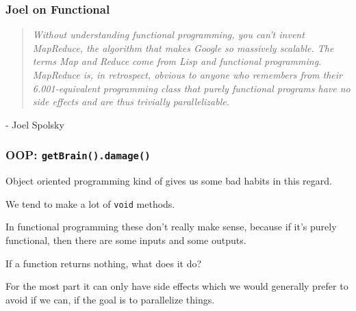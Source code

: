\begin{frame}
\frametitle{Joel on Functional}

\begin{quote}
\textit{Without understanding functional programming, you can't invent MapReduce, the algorithm that makes Google so massively scalable. The terms Map and Reduce come from Lisp and functional programming. MapReduce is, in retrospect, obvious to anyone who remembers from their 6.001-equivalent programming class that purely functional programs have no side effects and are thus trivially parallelizable.}
\end{quote}
\hfill - Joel Spolsky


\end{frame}



\begin{frame}
\frametitle{OOP: \texttt{getBrain().damage()}}

Object oriented programming kind of gives us some bad habits in this regard. 

We tend to make a lot of \texttt{void} methods. 

In functional programming these don't really make sense, because if it's purely functional, then there are some inputs and some outputs. 

If a function returns nothing, what does it do? 

For the most part it can only have side effects which we would generally prefer to avoid if we can, if the goal is to parallelize things. 

\end{frame}



